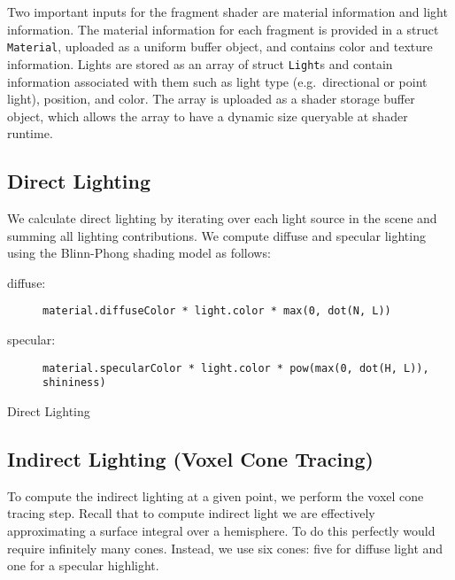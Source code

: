 
Two important inputs for the fragment shader are material information and light information. The material information for each fragment is provided in a struct \texttt{Material}, uploaded as a uniform buffer object, and contains color and texture information. Lights are stored as an array of struct \texttt{Light}s and contain information associated with them such as light type (e.g.\ directional or point light), position, and color. The array is uploaded as a shader storage buffer object, which allows the array to have a dynamic size queryable at shader runtime.


\subsection{Direct Lighting}
We calculate direct lighting by iterating over each light source in the scene and summing all lighting contributions. We compute diffuse and specular lighting using the Blinn-Phong shading model as follows:
\begin{description}
    \item[diffuse:] \texttt{material.diffuseColor * light.color * max(0, dot(N, L))}
    \item[specular:] \texttt{material.specularColor * light.color * pow(max(0, dot(H, L)), shininess)}
\end{description}

\begin{algorithm}
    \caption{Direct Lighting}
    \label{alg:directlighting}
    \begin{algorithmic}
        \EndProcedure
    \end{algorithmic}
\end{algorithm}

\subsection{Indirect Lighting (Voxel Cone Tracing)}
To compute the indirect lighting at a given point, we perform the voxel cone tracing step. Recall that to compute indirect light we are effectively approximating a surface integral over a hemisphere. To do this perfectly would require infinitely many cones. Instead, we use six cones: five for diffuse light and one for a specular highlight.

